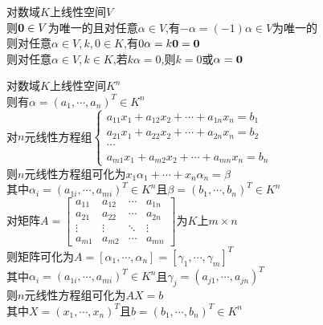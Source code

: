 \begin{dingli}
对数域$K$上线性空间$V$\\
则${\bf0}\in V$为唯一的且对任意$\alpha\in V$,有$-\alpha=(-1)\alpha\in V$为唯一的\\
则对任意$\alpha\in V,k,0\in K$,有$0\alpha=k{\bf0}={\bf0}$\\
则对任意$\alpha\in V,k\in K$,若$k\alpha=0$,则$k=0$或$\alpha={\bf0}$
\end{dingli}

\begin{dingyi}
对数域$K$上线性空间$K^n$\\
则有$\alpha=(a_1,\cdots,a_n)^{T}\in K^n$\\
对$n$元线性方程组$\begin{cases}a_{11}x_1+a_{12}x_2+\cdots+a_{1n}x_n=b_1\\ a_{21}x_1+a_{22}x_2+\cdots+a_{2n}x_n=b_2\\ \cdots\\ a_{m1}x_1+a_{m2}x_2+\cdots+a_{mn}x_n=b_n\end{cases}$\\
则$n$元线性方程组可化为$x_1\alpha_1+\cdots+x_n\alpha_n=\beta$\\
其中$\alpha_i=(a_{1i},\cdots,a_{mi})^{T}\in K^n$且$\beta=(b_1,\cdots,b_n)^{T}\in K^n$\\
对矩阵$A=\begin{bmatrix}a_{11} & a_{12} & \cdots & a_{1n}\\ a_{21} & a_{22} & \cdots & a_{2n}\\ \vdots & \vdots & \ddots & \vdots\\ a_{m1} & a_{m2} & \cdots & a_{mn} \end{bmatrix}$为$K$上$m\times n$\\
则矩阵可化为$A=[\alpha_1,\cdots,\alpha_n]=[\gamma_1,\cdots,\gamma_m]^{T}$\\
其中$\alpha_i=(a_{1i},\cdots,a_{mi})^{T}\in K^n$且$\gamma_j=(a_{j1},\cdots,a_{jn})^{T}$\\
则$n$元线性方程组可化为$AX=b$\\
其中$X=(x_1,\cdots,x_n)^{T}$且$b=(b_1,\cdots,b_n)^{T}\in K^n$
\end{dingyi}

